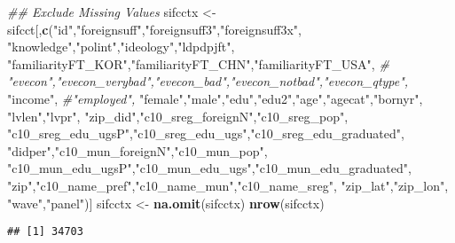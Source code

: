 \documentclass[
]{article}
\newenvironment{Shaded}{\begin{snugshade}}{\end{snugshade}}
\newcommand{\CommentTok}[1]{\textcolor[rgb]{0.56,0.35,0.01}{\textit{#1}}}
\newcommand{\KeywordTok}[1]{\textcolor[rgb]{0.13,0.29,0.53}{\textbf{#1}}}
\newcommand{\NormalTok}[1]{#1}
\newcommand{\OperatorTok}[1]{\textcolor[rgb]{0.81,0.36,0.00}{\textbf{#1}}}
\newcommand{\StringTok}[1]{\textcolor[rgb]{0.31,0.60,0.02}{#1}}
\begin{document}
\begin{Shaded}
\begin{Highlighting}[]
\CommentTok{## Exclude Missing Values}
\NormalTok{sifcctx <-}\StringTok{ }\NormalTok{sifcct[,}\KeywordTok{c}\NormalTok{(}\StringTok{"id"}\NormalTok{,}\StringTok{"foreignsuff"}\NormalTok{,}\StringTok{"foreignsuff3"}\NormalTok{,}\StringTok{"foreignsuff3x"}\NormalTok{,}
                     \StringTok{"knowledge"}\NormalTok{,}\StringTok{"polint"}\NormalTok{,}\StringTok{"ideology"}\NormalTok{,}\StringTok{"ldpdpjft"}\NormalTok{,}
                     \StringTok{"familiarityFT_KOR"}\NormalTok{,}\StringTok{"familiarityFT_CHN"}\NormalTok{,}\StringTok{"familiarityFT_USA"}\NormalTok{,}
                     \CommentTok{# "evecon","evecon_verybad","evecon_bad","evecon_notbad","evecon_qtype",}
                     \StringTok{"income"}\NormalTok{, }\CommentTok{#"employed",}
                     \StringTok{"female"}\NormalTok{,}\StringTok{"male"}\NormalTok{,}\StringTok{"edu"}\NormalTok{,}\StringTok{"edu2"}\NormalTok{,}\StringTok{"age"}\NormalTok{,}\StringTok{"agecat"}\NormalTok{,}\StringTok{"bornyr"}\NormalTok{,}
                     \StringTok{"lvlen"}\NormalTok{,}\StringTok{"lvpr"}\NormalTok{,}
                     \StringTok{"zip_did"}\NormalTok{,}\StringTok{"c10_sreg_foreignN"}\NormalTok{,}\StringTok{"c10_sreg_pop"}\NormalTok{,}
                     \StringTok{"c10_sreg_edu_ugsP"}\NormalTok{,}\StringTok{"c10_sreg_edu_ugs"}\NormalTok{,}\StringTok{"c10_sreg_edu_graduated"}\NormalTok{,}
                     \StringTok{"didper"}\NormalTok{,}\StringTok{"c10_mun_foreignN"}\NormalTok{,}\StringTok{"c10_mun_pop"}\NormalTok{,}
                     \StringTok{"c10_mun_edu_ugsP"}\NormalTok{,}\StringTok{"c10_mun_edu_ugs"}\NormalTok{,}\StringTok{"c10_mun_edu_graduated"}\NormalTok{,}
                     \StringTok{"zip"}\NormalTok{,}\StringTok{"c10_name_pref"}\NormalTok{,}\StringTok{"c10_name_mun"}\NormalTok{,}\StringTok{"c10_name_sreg"}\NormalTok{,}
                     \StringTok{"zip_lat"}\NormalTok{,}\StringTok{"zip_lon"}\NormalTok{,}
                     \StringTok{"wave"}\NormalTok{,}\StringTok{"panel"}\NormalTok{)]}
\NormalTok{sifcctx <-}\StringTok{ }\KeywordTok{na.omit}\NormalTok{(sifcctx)}
\KeywordTok{nrow}\NormalTok{(sifcctx)}
\end{Highlighting}
\end{Shaded}

\begin{verbatim}
## [1] 34703
\end{verbatim}

\begin{Shaded}
\end{Shaded}
\end{document}
